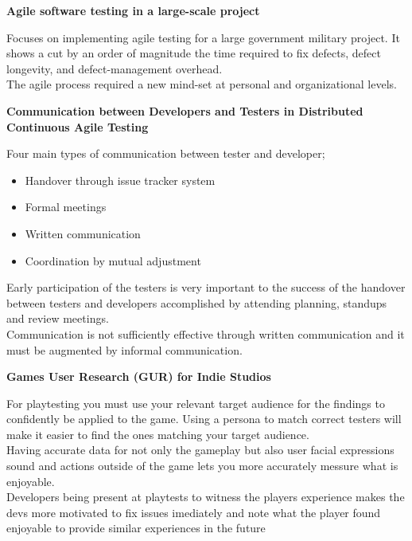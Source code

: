 \documentclass{beamer}
\begin{document}
	\small
	\begin{frame}
	
	\textbf{Agile software testing in a large-scale project} 
	
	Focuses on implementing agile testing for a large government military project. It shows a cut by an order of magnitude the time
	required to fix defects, defect longevity, and defect-management overhead.\\
	The agile process required a new mind-set at personal and organizational levels.
	\end{frame}
	\begin{frame}
	\textbf{Communication between Developers and Testers in Distributed Continuous Agile Testing}
	
	Four main types of communication between tester and developer;
	\begin{itemize}
		\item Handover through issue tracker system
		\item Formal meetings
		\item Written communication
		\item Coordination by mutual adjustment
	\end{itemize}
	Early participation of the testers is very important to the success of the handover between testers and developers accomplished by attending planning, standups and review meetings. \\
	Communication is not sufficiently effective through written communication and it must be augmented by informal communication.	
	\end{frame}
	\begin{frame}

	\textbf{Games User Research (GUR) for Indie Studios }	
	
	For playtesting you must use your relevant target audience for the findings to confidently be applied to the game.
	Using a persona to match correct testers will make it easier to find the ones matching your target audience.\\
	Having accurate data for not only the gameplay but also user facial expressions sound and actions outside of the game lets you more accurately messure what is enjoyable.\\
	Developers being present at playtests to witness the players experience makes the devs more motivated to fix issues imediately and note what the player found enjoyable to provide similar experiences in the future
	\end{frame}
\end{document}
